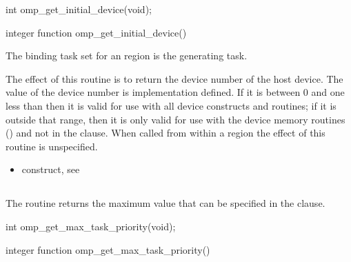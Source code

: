 \begin{samepage}
\format
\ccppspecificstart
\begin{boxedcode}
int omp\_get\_initial\_device(void);
\end{boxedcode}
\ccppspecificend
\end{samepage}

\fortranspecificstart
\begin{boxedcode}
integer function omp\_get\_initial\_device()
\end{boxedcode}
\fortranspecificend

\binding
The binding task set for an  region is the generating task.

\effect
The effect of this routine is to return the device number of the host device.
The value of the device number is implementation defined. If it is between 0 
and one less than  then it is valid for use 
with all device constructs and routines; if it is outside that range, then 
it is only valid for use with the device memory routines 
() and not in the  clause.
When called from within a  region 
the effect of this routine is unspecified.

\crossreferences
\begin{itemize}
\item {} construct, see 
\end{itemize}




\subsection{}
\label{subsec:omp_get_max_task_priority}
\summary

The  routine returns the maximum value that can be
specified in the  clause.

\begin{samepage}
\format
\ccppspecificstart
\begin{boxedcode}
int omp\_get\_max\_task\_priority(void);
\end{boxedcode}
\ccppspecificend
\end{samepage}

\fortranspecificstart
\begin{boxedcode}
integer function omp\_get\_max\_task\_priority()
\end{boxedcode}
\fortranspecificend

